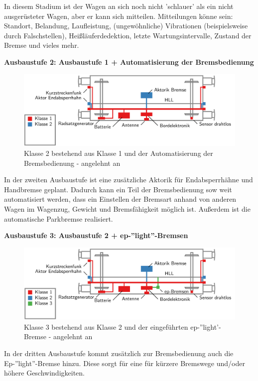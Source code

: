 In diesem Stadium ist der Wagen an sich noch nicht 'schlauer' als ein nicht ausgerüsteter Wagen, aber er kann sich mitteilen. Mitteilungen könne sein: Standort, Belandung, Laufleistung, (ungewöhnliche) Vibrationen (beispielsweise durch Falschstellen), Heißläuferdedektion, letzte Wartungsintervalle, Zustand der Bremse und vieles mehr.\par
\textbf{Ausbaustufe 2: Ausbaustufe 1 + Automatisierung der Bremsbedienung}\par
\begin{figure}[htbp] 
    \includegraphics[width=\textwidth]{Bilder/Ausbaustufen_2.PNG}
    \caption{Klasse 2 bestehend aus Klasse 1 und der Automatisierung der Bremsbedienung - angelehnt an \cite{Ausbaustufen}}
    \label{fig:Klasse2}
\end{figure} 
In der zweiten Ausbaustufe ist eine zusätzliche Aktorik für Endabsperrhähne und Handbremse geplant. Dadurch kann ein Teil der Bremsbedienung sow weit automatisiert werden, dass ein Einstellen der Bremsart anhand von anderen Wagen im Wagenzug, Gewicht und Bremsfähigkeit möglich ist. Außerdem ist die automatische Parkbremse realisiert.\par
\textbf{Ausbaustufe 3: Ausbaustufe 2 + ep-''light''-Bremsen}\par
\begin{figure}[htbp] 
    \includegraphics[width=\textwidth]{Bilder/Ausbaustufen_3.PNG}
    \caption{Klasse 3 bestehend aus Klasse 2 und der eingeführten ep-''light'-Bremse - angelehnt an \cite{Ausbaustufen}}
    \label{fig:Klasse3}
\end{figure} 
In der dritten Ausbaustufe kommt zusätzlich zur Bremsbedienung auch die Ep-''light''-Bremse hinzu. Diese sorgt für eine für kürzere Bremswege und/oder höhere Geschwindigkeiten.\par
